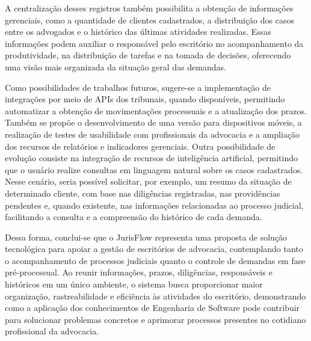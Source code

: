 A centralização desses registros também possibilita a obtenção de informações gerenciais, como a quantidade de clientes cadastrados, a distribuição dos casos entre os advogados e o histórico das últimas atividades realizadas. Essas informações podem auxiliar o responsável pelo escritório no acompanhamento da produtividade, na distribuição de tarefas e na tomada de decisões, oferecendo uma visão mais organizada da situação geral das demandas.

Como possibilidades de trabalhos futuros, sugere-se a implementação de integrações por meio de APIs dos tribunais, quando disponíveis, permitindo automatizar a obtenção de movimentações processuais e a atualização dos prazos. Também se propõe o desenvolvimento de uma versão para dispositivos móveis, a realização de testes de usabilidade com profissionais da advocacia e a ampliação dos recursos de relatórios e indicadores gerenciais. Outra possibilidade de evolução consiste na integração de recursos de inteligência artificial, permitindo que o usuário realize consultas em linguagem natural sobre os casos cadastrados. Nesse cenário, seria possível solicitar, por exemplo, um resumo da situação de determinado cliente, com base nas diligências registradas, nas providências pendentes e, quando existente, nas informações relacionadas ao processo judicial, facilitando a consulta e a compreensão do histórico de cada demanda.

Dessa forma, conclui-se que o JurisFlow representa uma proposta de solução tecnológica para apoiar a gestão de escritórios de advocacia, contemplando tanto o acompanhamento de processos judiciais quanto o controle de demandas em fase pré-processual. Ao reunir informações, prazos, diligências, responsáveis e históricos em um único ambiente, o sistema busca proporcionar maior organização, rastreabilidade e eficiência às atividades do escritório, demonstrando como a aplicação dos conhecimentos de Engenharia de Software pode contribuir para solucionar problemas concretos e aprimorar processos presentes no cotidiano profissional da advocacia.